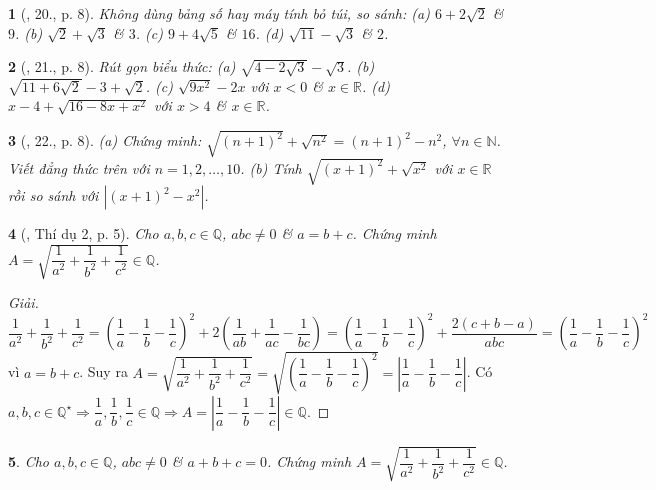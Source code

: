 \documentclass{article}
\newtheorem{baitoan}{}%
\begin{document}
\begin{baitoan}[\cite{SBT_Toan_9_tap_1}, 20., p. 8]
	Không dùng bảng số hay máy tính bỏ túi, so sánh: (a) $6 + 2\sqrt{2}$ \& $9$. (b) $\sqrt{2} + \sqrt{3}$ \& $3$. (c) $9 + 4\sqrt{5}$ \& $16$. (d) $\sqrt{11} - \sqrt{3}$ \& $2$.
\end{baitoan}

\begin{baitoan}[\cite{SBT_Toan_9_tap_1}, 21., p. 8]
	Rút gọn biểu thức: (a) $\sqrt{4 - 2\sqrt{3}} - \sqrt{3}$. (b) $\sqrt{11 + 6\sqrt{2}} - 3 + \sqrt{2}$. (c) $\sqrt{9x^2} - 2x$ với $x < 0$ \& $x\in\mathbb{R}$. (d) $x - 4 + \sqrt{16 - 8x + x^2}$ với $x > 4$ \& $x\in\mathbb{R}$.
\end{baitoan}

\begin{baitoan}[\cite{SBT_Toan_9_tap_1}, 22., p. 8]
	(a) Chứng minh: $\sqrt{(n + 1)^2} + \sqrt{n^2} = (n + 1)^2 - n^2$, $\forall n\in\mathbb{N}$. Viết đẳng thức trên với $n = 1,2,\ldots,10$. (b) Tính $\sqrt{(x + 1)^2} + \sqrt{x^2}$ với $x\in\mathbb{R}$ rồi so sánh với $|(x + 1)^2 - x^2|$.
\end{baitoan}

\begin{baitoan}[\cite{Tuyen_Toan_9_old}, Thí dụ 2, p. 5]
	\label{prob: Tuyen_Toan_9 VD 2 p. 5}
	Cho $a,b,c\in\mathbb{Q}$, $abc\ne0$ \& $a = b + c$. Chứng minh $A = \sqrt{\dfrac{1}{a^2} + \dfrac{1}{b^2} + \dfrac{1}{c^2}}\in\mathbb{Q}$.
\end{baitoan}

\begin{proof}[Giải]
	$\dfrac{1}{a^2} + \dfrac{1}{b^2} + \dfrac{1}{c^2} = \left(\dfrac{1}{a} - \dfrac{1}{b} - \dfrac{1}{c}\right)^2 + 2\left(\dfrac{1}{ab} + \dfrac{1}{ac} - \dfrac{1}{bc}\right) = \left(\dfrac{1}{a} - \dfrac{1}{b} - \dfrac{1}{c}\right)^2 + \dfrac{2(c + b - a)}{abc} = \left(\dfrac{1}{a} - \dfrac{1}{b} - \dfrac{1}{c}\right)^2$ vì $a = b + c$. Suy ra $A = \sqrt{\dfrac{1}{a^2} + \dfrac{1}{b^2} + \dfrac{1}{c^2}} = \sqrt{\left(\dfrac{1}{a} - \dfrac{1}{b} - \dfrac{1}{c}\right)^2} = \left|\dfrac{1}{a} - \dfrac{1}{b} - \dfrac{1}{c}\right|$. Có $a,b,c\in\mathbb{Q}^\star\Rightarrow\dfrac{1}{a},\dfrac{1}{b},\dfrac{1}{c}\in\mathbb{Q}\Rightarrow A = \left|\dfrac{1}{a} - \dfrac{1}{b} - \dfrac{1}{c}\right|\in\mathbb{Q}$.
\end{proof}

\begin{baitoan}
	\label{prob: Mo rong Tuyen_Toan_9 VD 2 p. 5}
	Cho $a,b,c\in\mathbb{Q}$, $abc\ne0$ \& $a + b + c = 0$. Chứng minh $A = \sqrt{\dfrac{1}{a^2} + \dfrac{1}{b^2} + \dfrac{1}{c^2}}\in\mathbb{Q}$.
\end{baitoan}
\end{document}
